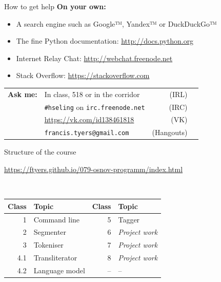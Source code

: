 \documentclass[10pt, compress]{beamer}
\begin{document}
\begin{frame}{How to get help}
\textbf{On your own:}
\begin{itemize}
  \item A search engine such as Google™, Yandex™ or DuckDuckGo™
  \item The fine Python documentation: \url{http://docs.python.org}
  \item Internet Relay Chat: \url{http://webchat.freenode.net}
  \item Stack Overflow: \url{https://stackoverflow.com}
\end{itemize}

\begin{center}
\begin{tabularx}{\textwidth}{lXrl}
   \textbf{Ask me:} &       In class, 518 or in the corridor & (IRL) \\
                 & {\tt \#hseling} on {\tt irc.freenode.net} & (IRC) \\
                 & \url{https://vk.com/id138461818} & (VK) \\
                 & {\tt francis.tyers@gmail.com} & (Hangouts) \\ 
\end{tabularx}
\end{center}

\end{frame}

\begin{frame}{Structure of the course}

\begin{center}
\url{https://ftyers.github.io/079-osnov-programm/index.html}
\end{center}
~\\
\begin{center}
\begin{tabular}{rlrl}
\textbf{Class} & \textbf{Topic}   & \textbf{Class} & \textbf{Topic} \\
\hline
1  & Command line & 5   & Tagger  \\
2  & Segmenter & 6   &  \emph{Project work} \\
3  & Tokeniser & 7   &  \emph{Project work} \\
4.1  & Transliterator & 8  &  \emph{Project work} \\
4.2  & Language model & -- & --  \\
\end{tabular}
\end{center}


\end{frame}
\end{document}
